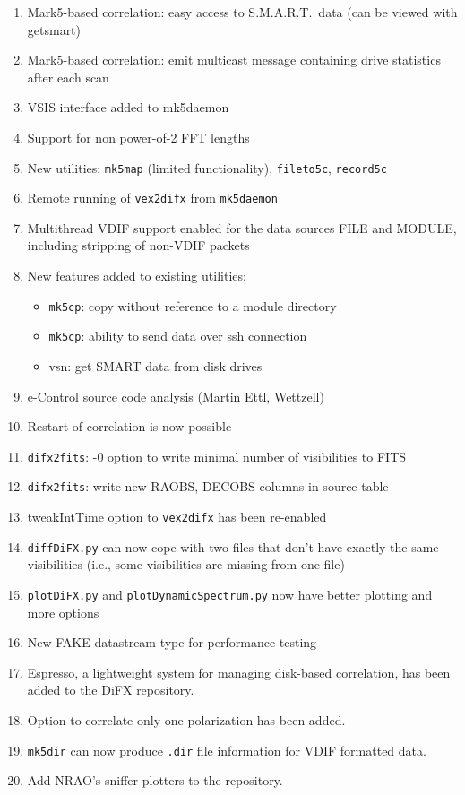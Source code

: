 \begin{enumerate}
\item Mark5-based correlation: easy access to S.M.A.R.T.\ data (can be viewed with getsmart)
\item Mark5-based correlation: emit multicast message containing drive statistics after each scan
\item VSIS interface added to mk5daemon
\item Support for non power-of-2 FFT lengths
\item New utilities: {\tt mk5map} (limited functionality), {\tt fileto5c}, {\tt record5c}
\item Remote running of {\tt vex2difx} from {\tt mk5daemon}
\item Multithread VDIF support enabled for the data sources FILE and MODULE, including stripping of non-VDIF packets
\item New features added to existing utilities:
\begin{itemize}
\item {\tt mk5cp}: copy without reference to a module directory
\item {\tt mk5cp}: ability to send data over ssh connection
\item vsn: get SMART data from disk drives
\end{itemize}
\item e-Control source code analysis (Martin Ettl, Wettzell)
\item Restart of correlation is now possible
\item {\tt difx2fits}: -0 option to write minimal number of visibilities to FITS
\item {\tt difx2fits}: write new RAOBS, DECOBS columns in source table
\item tweakIntTime option to {\tt vex2difx} has been re-enabled
\item {\tt diffDiFX.py} can now cope with two files that don't have exactly the same visibilities (i.e., some visibilities are missing from one file)
\item {\tt plotDiFX.py} and {\tt plotDynamicSpectrum.py} now have better plotting and more options
\item New FAKE datastream type for performance testing
\item Espresso, a lightweight system for managing disk-based correlation, has been added to the DiFX repository. 
\item Option to correlate only one polarization has been added.
\item {\tt mk5dir} can now produce {\tt .dir} file information for VDIF formatted data.
\item Add NRAO's sniffer plotters to the repository.
\end{enumerate}

